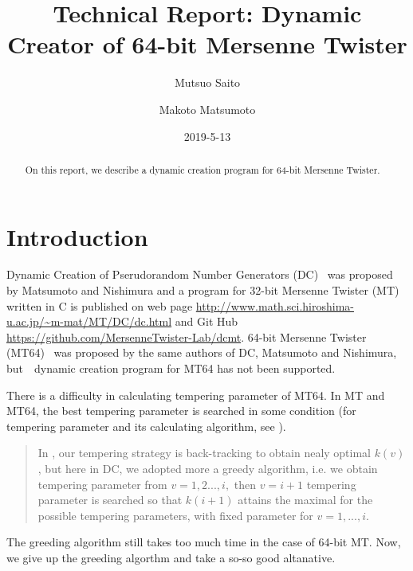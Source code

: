 \documentclass{article}
\title{Technical Report: Dynamic Creator of 64-bit Mersenne Twister}
\author{Mutsuo Saito \and Makoto Matsumoto}
\date{2019-5-13}
\begin{document}
\maketitle

\begin{abstract}
  On this report, we describe a dynamic creation program for 64-bit
  Mersenne Twister.
\end{abstract}



\section{Introduction}

Dynamic Creation of Pserudorandom Number Generators (DC)~\cite{DC} was
proposed by Matsumoto and Nishimura and a program for 32-bit Mersenne
Twister (MT)~\cite{MT} written in C is published on web page
\url{http://www.math.sci.hiroshima-u.ac.jp/~m-mat/MT/DC/dc.html} and
Git Hub \url{https://github.com/MersenneTwister-Lab/dcmt}.
64-bit Mersenne Twister (MT64)~\cite{MT64} was proposed by the same
authors of DC, Matsumoto and Nishimura, but　dynamic creation program
for MT64 has not been supported.

There is a difficulty in calculating tempering parameter of MT64.  In
MT and MT64, the best tempering parameter is searched in some
condition (for tempering parameter and its calculating algorithm, see
\cite{MT, MT64}).

\begin{quote}
  In \cite{TGFSRII}\cite{MT}, our tempering strategy is back-tracking
  to obtain nealy optimal $k(v)$, but here in DC, we adopted more a
  greedy algorithm, i.e. we obtain tempering parameter from
  $v = 1, 2 ..., i,$ then $v = i + 1$ tempering parameter is searched
  so that $k(i+1)$ attains the maximal for the possible tempering
  parameters, with fixed parameter for $v = 1, ..., i$.
\end{quote}

The greeding algorithm still takes too much time in the case of 64-bit
MT.  Now, we give up the greeding algorthm and take a so-so good
altanative.




\end{document}
